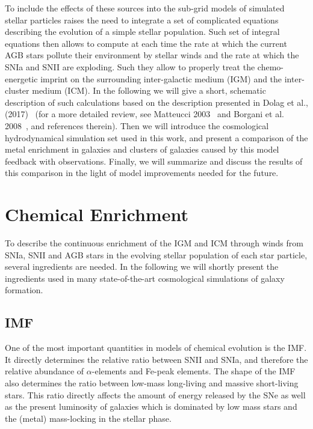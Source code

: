 \documentclass[galaxies,letter,accept,moreauthors,pdftex,10pt,a4paper,usenatbib]{mdpi}
\begin{document}
To include the effects of these sources into the sub-grid models of
simulated stellar particles raises the need to integrate a set of
complicated equations describing the evolution of a simple stellar
population. Such set of integral equations then allows to compute at
each time the rate at which the current AGB stars pollute their environment
by stellar winds and the rate at which the SNIa and SNII are exploding.
Such they allow to properly treat the chemo-energetic imprint on the
surrounding inter-galactic medium (IGM) and the inter-cluster medium (ICM).
In the following we
will give a short, schematic description of such calculations based on
the description presented in Dolag et al., (2017)~\cite{Dolag2017} (for
a more detailed review, see Matteucci 2003~\cite{Matteucci2003} and
Borgani et al. 2008~\cite{Borgani2008}, and references
therein). Then we will introduce the cosmological hydrodynamical
simulation set used in this work, and present a comparison of the
metal enrichment in galaxies and clusters of galaxies caused by this
model feedback with observations. Finally, we will summarize and
discuss the results of this comparison in the light of model
improvements needed for the future.

\section{Chemical Enrichment}

To describe the continuous enrichment of the IGM and ICM through winds
from SNIa, SNII and AGB stars in the evolving stellar population of
each star particle, several ingredients are needed. In the following
we will shortly present the ingredients used in many state-of-the-art
cosmological simulations of galaxy formation.

\subsection{IMF}
One of the most important quantities in models of chemical evolution
is the IMF. It directly determines the
relative ratio between SNII and SNIa, and therefore the relative
abundance of $\alpha$-elements and Fe-peak elements. The shape of the
IMF also determines the ratio between low-mass long-living and massive
short-living stars. This ratio directly affects the amount of energy
released by the SNe as well as the present luminosity of galaxies
which is dominated by low mass stars and the (metal) mass-locking in
the stellar phase.
\end{document}
